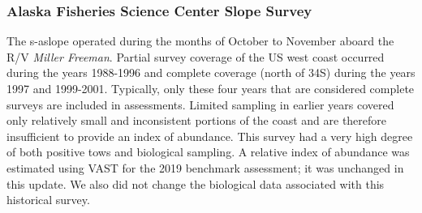 \documentclass[11pt,
  english,
  a4paper,
]{article}
\begin{document}

\hypertarget{alaska-fisheries-science-center-slope-survey}{%
\subsubsection{Alaska Fisheries Science Center Slope Survey}\label{alaska-fisheries-science-center-slope-survey}}

\leavevmode\tagmcend\tagstructend


The \gls{s-aslope} operated during the months of October to November aboard the R/V \emph{Miller Freeman}. Partial survey coverage of the US west coast occurred during the years 1988-1996 and complete coverage (north of 34\textquotesingle S) during the years 1997 and 1999-2001. Typically, only these four years that are considered complete surveys are included in assessments. Limited sampling in earlier years covered only relatively small and inconsistent portions of the coast and are therefore insufficient to provide an index of abundance. This survey had a very high degree of both positive tows and biological sampling. A relative index of abundance was estimated using VAST for the 2019 benchmark assessment; it was unchanged in this update. We also did not change the biological data associated with this historical survey.

\leavevmode\tagmcend\tagstructend\par
\end{document}
